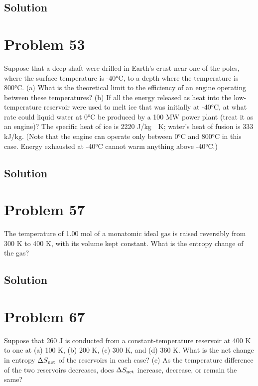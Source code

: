 \documentclass[12pt]{article}
\begin{document}
        \subsection{Solution}

    \section{Problem 53}
        Suppose that a deep shaft were drilled in Earth's crust near one of the poles, where the surface temperature is -40\unit{\celsius}, to a depth where the temperature is 800°C. 
        (a) What is the theoretical limit to the efficiency of an engine operating between these temperatures?
        (b) If all the energy released as heat into the low-temperature reservoir were used to melt ice that was initially at -40\unit{\celsius}, at what rate could liquid water at 0\unit{\celsius} be produced by a 100 MW power plant (treat it as an engine)? 
        The specific heat of ice is 2220 \unit{\joule/\kilo\gram\cdot\kelvin}; water's heat of fusion is 333 \unit{\kilo\joule/\kilo\gram}. 
        (Note that the engine can operate only between 0\unit{\celsius} and 800\unit{\celsius} in this case. 
        Energy exhausted at -40\unit{\celsius} cannot warm anything above -40\unit{\celsius}.)

        \subsection{Solution}

    \section{Problem 57}
        The temperature of 1.00 mol of a monatomic ideal gas is raised reversibly from 300 K to 400 K, with its volume kept constant. 
        What is the entropy change of the gas?

        \subsection{Solution}

    \section{Problem 67}
        Suppose that 260 J is conducted from a constant-temperature reservoir at 400 K to one at (a) 100 K, (b) 200 K, (c) 300 K, and (d) 360 K. 
        What is the net change in entropy $\Delta S_{\rm net}$ of the reservoirs in each case? 
        (e) As the temperature difference of the two reservoirs decreases, does $\Delta S_{\rm net}$ increase, decrease, or remain the same?
\end{document}
